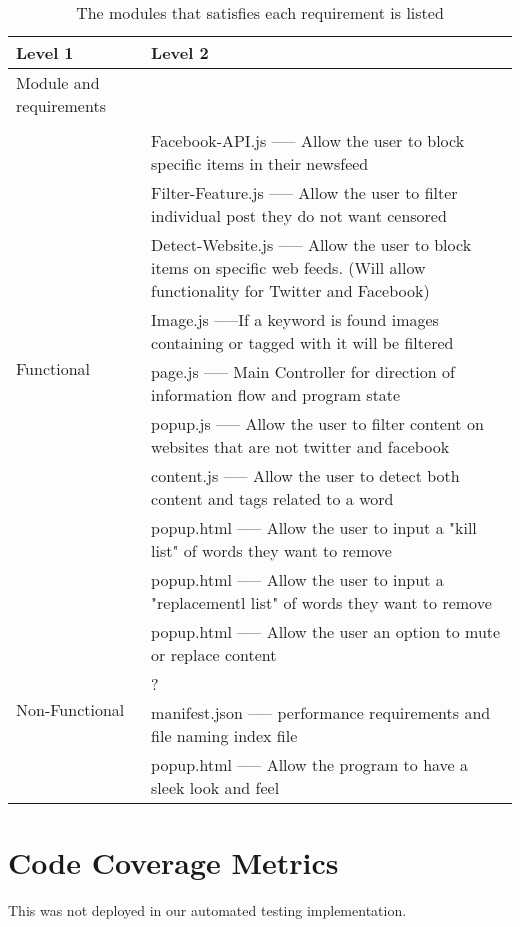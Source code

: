 \documentclass[12pt, titlepage]{article}
\begin{document}
\begin{table}[H]
\centering
\begin{tabular}{p{} p{}}
\toprule
\textbf{Level 1} & \textbf{Level 2}\\
\midrule
{Module and requirements} & ~ \\
\midrule
\multirow{10}{0.3\textwidth}{Functional}\\
& Facebook-API.js ----- Allow the user to block specific items in their newsfeed\\
&Filter-Feature.js ----- Allow the user to filter individual post they do not want censored\\
&Detect-Website.js ----- Allow the user to block items on specific web feeds. (Will allow functionality for Twitter and Facebook)\\
&Image.js -----If a keyword is found images containing or tagged with it will be filtered\\
& page.js ----- Main Controller for direction of information flow and program state\\
& popup.js ----- Allow the user to filter content on websites that are not twitter and facebook\\
& content.js ----- Allow the user to detect both content and tags related to a word\\
& popup.html ----- Allow the user to input a "kill list" of words they want to remove\\
& popup.html ----- Allow the user to input a "replacementl list" of words they want to remove\\
& popup.html ----- Allow the user an option to mute or replace content\\
\midrule
\multirow{2}{0.3\textwidth}{Non-Functional} & {?}\\
& manifest.json ----- performance requirements and file naming index file\\
& popup.html ----- Allow the program to have a sleek look and feel\\

\bottomrule
\end{tabular}
\caption{The modules that satisfies each requirement is listed}
\label{TblMH}
\end{table}
		
\section{Code Coverage Metrics}

This was not deployed in our automated testing implementation.
\end{document}
